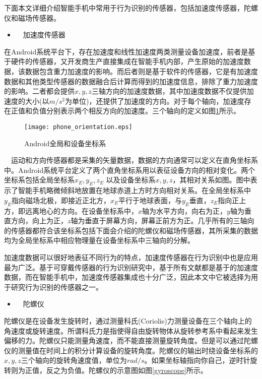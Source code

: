 \par 下面本文详细介绍智能手机中常用于行为识别的传感器，包括加速度传感器，陀螺仪和磁场传感器。
\begin{itemize}
	\item　加速度传感器
\end{itemize}
\par 在Android系统平台下，存在加速度和线性加速度两类测量设备加速度，前者是基于硬件的传感器，又开发商生产直接集成在智能手机内部，产生原始的加速度数据，该数据包含重力加速度的影响。而后者则是基于软件的传感器，它是有加速度数据和其他类型传感器的数据融合后计算而得到的加速度信息，排除了重力加速度的影响。二者都会提供$x,  y,  z$三轴方向的加速度数据，其中加速度数据不仅提供加速度的大小(以$m/s^2$为单位)，还提供了加速度的方向。对于每个轴向，加速度存在正值和负值分别表示两个相反方向的加速度。三个轴向的定义如图\ref{phone_orientation}所示。

\begin{figure}[ht]
\centering
\texttt{[image: phone\_orientation.eps]}
\caption{Android全局和设备坐标系} \label{phone_orientation}
\end{figure}

\par　运动和方向传感器都是采集的矢量数据，数据的方向通常可以定义在直角坐标系中。Android系统平台定义了两个直角坐标系用以表征设备方向的相对变化。两个坐标系包括全局坐标系$x_E,  y_E,  z_E$ 以及设备坐标系$x,  y,  z$，其相对关系如图。图中表示了智能手机略微倾斜地放置在地球赤道上方时方向相对关系。在全局坐标系中$y_E$指向磁场北极，即接近正北方，$x_E$平行于地球表面，与$y_E$垂直，$z_E$指向正上方，即远离地心的方向。在设备坐标系中，$x$轴为水平方向，向右为正，$y$轴为垂直方向，向上为正，$z$轴为垂直于屏幕方向，屏幕正前方为正。几乎所有的三轴向的传感器都符合该坐标系包括下面会介绍的陀螺仪和磁场传感器，其所采集的数据均为全局坐标系中相应物理量在设备坐标系中三轴向的分解。
\par 加速度数据可以很好地表征不同行为的特点，加速度传感器在行为识别中也是应用最为广泛。基于可穿戴传感器的行为识别研究中，基于所有文献都是基于的加速度数据，而在智能手机中，加速度传感器集成也十分广泛，因此本文中它被选择为用于研究行为识别的传感器之一。

\begin{itemize}
	\item　陀螺仪
\end{itemize}
\par 陀螺仪是在设备发生旋转时，通过测量科氏(Coriolis)力测量设备在三个轴向上的角速度或旋转速度。所谓科氏力是指使得自由旋转物体从旋转参考系中看起来发生偏移的力。陀螺仪只能测量角速度，而不能直接测量旋转角度。但是可以通过陀螺仪的测量值在时间上的积分计算设备的旋转角度。陀螺仪的输出时绕设备坐标系的$x,  y,  z$三个轴向的旋转角速度值，单位为$rad/s$。如果坐标轴指向你自己，逆时针旋转则为正值，反之为负值。陀螺仪的示意图如图\ref{gyroscope}所示。

